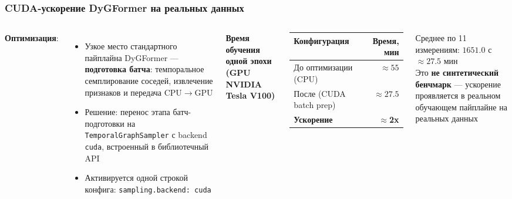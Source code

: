 \documentclass[aspectratio=169]{beamer}
\begin{document}
\begin{frame}
  \frametitle{CUDA-ускорение DyGFormer на реальных данных}
  \begin{columns}
    \small
    \textbf{Оптимизация}:
    \begin{itemize}
      \item Узкое место стандартного пайплайна DyGFormer — \textbf{подготовка батча}: темпоральное семплирование соседей, извлечение признаков и передача CPU$\to$GPU
      \item Решение: перенос этапа батч-подготовки на \texttt{TemporalGraphSampler} с backend \texttt{cuda}, встроенный в библиотечный API
      \item Активируется одной строкой конфига: \texttt{sampling.backend: cuda}
    \end{itemize}
    \small
    \textbf{Время обучения одной эпохи (GPU NVIDIA Tesla V100)}
    \begin{table}
    \small
    \begin{tabular}{lr}
      \toprule
      Конфигурация & Время, мин \\
      \midrule
      До оптимизации (CPU) & $\approx 55$ \\
      После (CUDA batch prep) & $\approx 27.5$ \\
      \midrule
      \textbf{Ускорение} & \textbf{$\approx$2x} \\
      \bottomrule
    \end{tabular}
    \end{table}
    \vspace{0.2cm}
    {\small Среднее по 11 измерениям: $1651.0$ с $\approx 27.5$ мин}\\
    \vspace{0.2cm}
    {\small Это \textbf{не синтетический бенчмарк} — ускорение проявляется в реальном обучающем пайплайне на реальных данных}
  \end{columns}
\end{frame}

\end{document}
